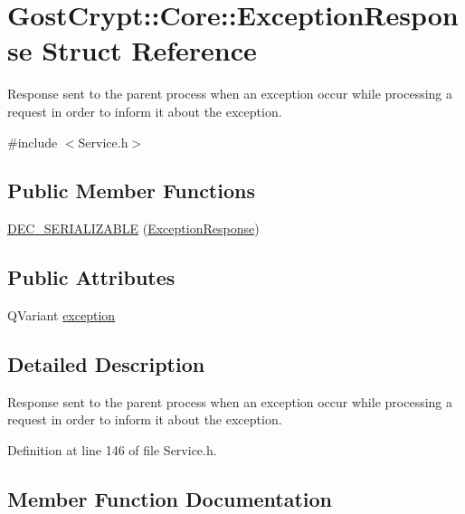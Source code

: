 \hypertarget{struct_gost_crypt_1_1_core_1_1_exception_response}{}\section{Gost\+Crypt\+:\+:Core\+:\+:Exception\+Response Struct Reference}
\label{struct_gost_crypt_1_1_core_1_1_exception_response}


Response sent to the parent process when an exception occur while processing a request in order to inform it about the exception.  




{\ttfamily \#include $<$Service.\+h$>$}

\subsection*{Public Member Functions}
\begin{DoxyCompactItemize}
\item 
\hyperlink{struct_gost_crypt_1_1_core_1_1_exception_response_ad8886f4a18f006e38ac4190cd3398010}{D\+E\+C\+\_\+\+S\+E\+R\+I\+A\+L\+I\+Z\+A\+B\+LE} (\hyperlink{struct_gost_crypt_1_1_core_1_1_exception_response}{Exception\+Response})
\end{DoxyCompactItemize}
\subsection*{Public Attributes}
\begin{DoxyCompactItemize}
\item 
Q\+Variant \hyperlink{struct_gost_crypt_1_1_core_1_1_exception_response_a93e66ad6ada02d1dce6ffadae38bb81b}{exception}
\end{DoxyCompactItemize}


\subsection{Detailed Description}
Response sent to the parent process when an exception occur while processing a request in order to inform it about the exception. 

Definition at line 146 of file Service.\+h.



\subsection{Member Function Documentation}
\mbox{\label{struct_gost_crypt_1_1_core_1_1_exception_response_ad8886f4a18f006e38ac4190cd3398010}} 
